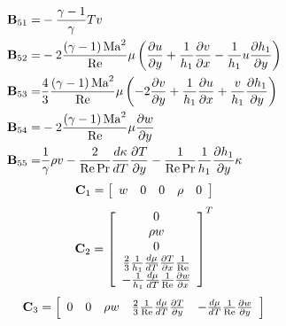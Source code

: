 \begin{align*}
  \mathbf{B}_{51} =& - \frac{{\gamma  - 1}}{\gamma }Tv\\
  \mathbf{B}_{52} =& - 2\frac{{\left( {\gamma  - 1} \right){\rm{Ma}}^2 }}{{{\mathop{\rm Re}\nolimits} }}\mu \left( {\frac{{\partial u}}{{\partial y}} + \frac{1}{{h_1 }}\frac{{\partial v}}{{\partial x}} - \frac{1}{{h_1 }}u\frac{{\partial h_1 }}{{\partial y}}} \right)\\
  \mathbf{B}_{53} =& \frac{{\rm{4}}}{3}\frac{{\left( {\gamma  - 1} \right){\rm{Ma}}^2 }}{{{\mathop{\rm Re}\nolimits} }}\mu \left( { - 2\frac{{\partial v}}{{\partial y}} + \frac{1}{{h_1 }}\frac{{\partial u}}{{\partial x}} + \frac{v}{{h_1 }}\frac{{\partial h_1 }}{{\partial y}}} \right)\\
  \mathbf{B}_{54} =& - 2\frac{{\left( {\gamma  - 1} \right){\rm{Ma}}^2 }}{{{\mathop{\rm Re}\nolimits} }}\mu \frac{{\partial w}}{{\partial y}}\\
  \mathbf{B}_{55} =& \frac{1}{\gamma }\rho v - \frac{2}{{{\mathop{\rm Re}\nolimits} \Pr }}\frac{{d\kappa }}{{dT}}\frac{{\partial T}}{{\partial y}} - \frac{1}{{{\mathop{\rm Re}\nolimits} \Pr }}\frac{1}{{h_1 }}\frac{{\partial h_1 }}{{\partial y}}\kappa
\end{align*}
\begin{equation*}
  {\bf{C}}_1  = \left[ {\begin{array}{*{20}c}
   w & 0 & 0 & \rho  & 0  \\
\end{array}} \right]
\end{equation*}
\begin{equation*}
  {\bf{C}}_2  = \left[ {\begin{array}{*{20}c}
   0  \\
   {\rho w}  \\
   0  \\
   {\frac{2}{3}\frac{1}{{h_1 }}\frac{{d\mu }}{{dT}}\frac{{\partial T}}{{\partial x}}\frac{1}{{{\mathop{\rm Re}\nolimits} }}}  \\
   { - \frac{1}{{h_1 }}\frac{{d\mu }}{{dT}}\frac{1}{{{\mathop{\rm Re}\nolimits} }}\frac{{\partial w}}{{\partial x}}}  \\
\end{array}} \right]^T
\end{equation*}
\begin{equation*}
  {\bf{C}}_3  = \left[ {\begin{array}{*{20}c}
   0 & 0 & {\rho w} & {\frac{2}{3}\frac{1}{{{\mathop{\rm Re}\nolimits} }}\frac{{d\mu }}{{dT}}\frac{{\partial T}}{{\partial y}}} & { - \frac{{d\mu }}{{dT}}\frac{1}{{{\mathop{\rm Re}\nolimits} }}\frac{{\partial w}}{{\partial y}}}  \\
\end{array}} \right]
\end{equation*}
